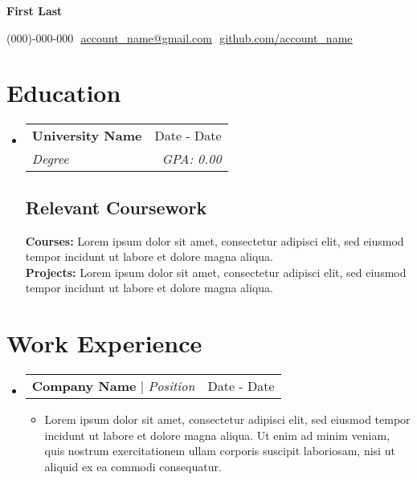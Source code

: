 \documentclass[letterpaper,12pt]{article}
\makeatletter
\newcommand{\resumeItem}[1]{
  \item\small{
    {#1 \vspace{-2pt}}
  }
}
\newcommand{\resumeSubheading}[4]{
  \vspace{-2pt}\item
    \begin{tabular*}{0.97\textwidth}[t]{l@{\extracolsep{\fill}}r}
      \textbf{#1} & #2 \\
      \textit{\small#3} & \textit{\small #4} \\
    \end{tabular*}\vspace{-7pt}
}
\newcommand{\resumeProjectHeading}[2]{
    \item
    \begin{tabular*}{0.97\textwidth}{l@{\extracolsep{\fill}}r}
      \small#1 & #2 \\
    \end{tabular*}\vspace{-7pt}
}
\newcommand{\resumeSubHeadingListStart}{\begin{itemize}[leftmargin=0.15in, label={}]}
\newcommand{\resumeSubHeadingListEnd}{\end{itemize}}
\newcommand{\resumeItemListStart}{\begin{itemize}}
\newcommand{\resumeItemListEnd}{\end{itemize}\vspace{-5pt}}
\makeatother
\begin{document}

\begin{center}
    \textbf{\Huge First Last} \\ \vspace{8pt}

    \small
    (000)-000-000 $  $
    \href{mailto:account_name@gmail.com}
    {\underline{account\_name@gmail.com}} $  $
    \href{https://github.com/account_name}
    {\underline{github.com/account\_name}}

\end{center}

\section{Education}
\resumeSubHeadingListStart

\resumeSubheading
{University Name}{Date - Date}
{Degree}{GPA: 0.00}

\subsection{Relevant Coursework}

\textbf{Courses:} Lorem ipsum dolor sit amet, consectetur adipisci elit, sed eiusmod tempor incidunt ut labore et dolore magna aliqua.  \\

\textbf{Projects:} Lorem ipsum dolor sit amet, consectetur adipisci elit, sed eiusmod tempor incidunt ut labore et dolore magna aliqua.
\resumeSubHeadingListEnd

\section{Work Experience}
\resumeSubHeadingListStart

\resumeProjectHeading
{\textbf{Company Name} $|$ \footnotesize\emph{Position}}{Date - Date}
\resumeItemListStart
\resumeItem{Lorem ipsum dolor sit amet, consectetur adipisci elit, sed eiusmod tempor incidunt ut labore et dolore magna aliqua. Ut enim ad minim veniam, quis nostrum exercitationem ullam corporis suscipit laboriosam, nisi ut aliquid ex ea commodi consequatur.}
\resumeItemListEnd

\resumeSubHeadingListEnd

\end{document}
